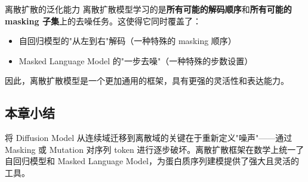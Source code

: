 \begin{importantbox}{离散扩散的泛化能力}
离散扩散模型学习的是\textbf{所有可能的解码顺序}和\textbf{所有可能的 masking 子集}上的去噪任务。这使得它同时覆盖了：
\begin{itemize}
    \item 自回归模型的"从左到右"解码（一种特殊的 masking 顺序）
    \item Masked Language Model 的"一步去噪"（一种特殊的步数设置）
\end{itemize}
因此，离散扩散模型是一个更加通用的框架，具有更强的灵活性和表达能力。
\end{importantbox}

\subsection{本章小结}

将 Diffusion Model 从连续域迁移到离散域的关键在于重新定义"噪声"——通过 Masking 或 Mutation 对序列 token 进行逐步破坏。离散扩散框架在数学上统一了自回归模型和 Masked Language Model，为蛋白质序列建模提供了强大且灵活的工具。


